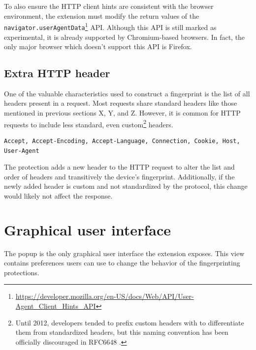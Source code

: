 \medbreak

To also ensure the HTTP client hints are consistent with the browser environment, the extension must modify the return values of the \texttt{navigator.userAgentData}\footnote{\url{https://developer.mozilla.org/en-US/docs/Web/API/User-Agent_Client_Hints_API}} API. Although this API is still marked as experimental, it is already supported by Chromium-based browsers. In fact, the only major browser which doesn't support this API is Firefox.

\subsection{Extra HTTP header}
\label{SubSection:ExtraHTTPHeader}

One of the valuable characteristics used to construct a fingerprint is the list of all headers present in a request. Most requests share standard headers like those mentioned in previous sections X, Y, and Z. However, it is common for HTTP requests to include less standard, even custom\footnote{Until 2012, developers tended to prefix custom headers with  to differentiate them from standardized headers, but this naming convention has been officially discouraged in RFC6648 \cite{RFC6648}.} headers.

\bigbreak

\begin{lstlisting}[caption={An example of a list of headers present in an HTTP request.}]
Accept, Accept-Encoding, Accept-Language, Connection, Cookie, Host, User-Agent
\end{lstlisting}

\medbreak

The protection adds a new header to the HTTP request to alter the list and order of headers and transitively the device's fingerprint. Additionally, if the newly added header is custom and not standardized by the protocol, this change would likely not affect the response.

\section{Graphical user interface}
\label{Section:GUI}

The popup is the only graphical user interface the extension exposes. This view contains preferences users can use to change the behavior of the fingerprinting protections.

\medbreak

